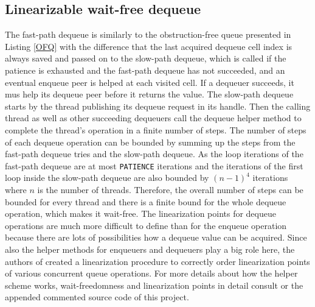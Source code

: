 \documentclass{article}
\begin{document}
\subsection{Linearizable wait-free dequeue}
The fast-path dequeue is similarly to the obstruction-free queue presented in Listing \ref{OFQ} with the difference that the last acquired dequeue cell index is always saved and passed on to the slow-path dequeue, which is called if the patience is exhausted and the fast-path dequeue has not succeeded, and an eventual enqueue peer is helped at each visited cell. If a dequeuer succeeds, it mus help its dequeue peer before it returns the value. The slow-path dequeue starts by the thread publishing its dequeue request in its handle. Then the calling thread as well as other succeeding dequeuers call the dequeue helper method to complete the thread's operation in a finite number of steps. The number of steps of each dequeue operation can be bounded by summing up the steps from the fast-path dequeue tries and the slow-path dequeue. As the loop iterations of the fast-path dequeue are at most \texttt{PATIENCE} iterations and the iterations of the first loop inside the slow-path dequeue are also bounded by $(n - 1)^4$ iterations where $n$ is the number of threads. Therefore, the overall number of steps can be bounded for every thread and there is a finite bound for the whole dequeue operation, which makes it wait-free. The linearization points for dequeue operations are much more difficult to define than for the enqueue operation because there are lots of possibilities how a dequeue value can be acquired. Since also the helper methods for enqueuers and dequeuers play a big role here, the authors of \cite{WFQ} created a linearization procedure to correctly order linearization points of various concurrent queue operations. For more details about how the helper scheme works, wait-freedomness and linearization points in detail consult \cite{WFQ} or the appended commented source code of this project.
\end{document}
